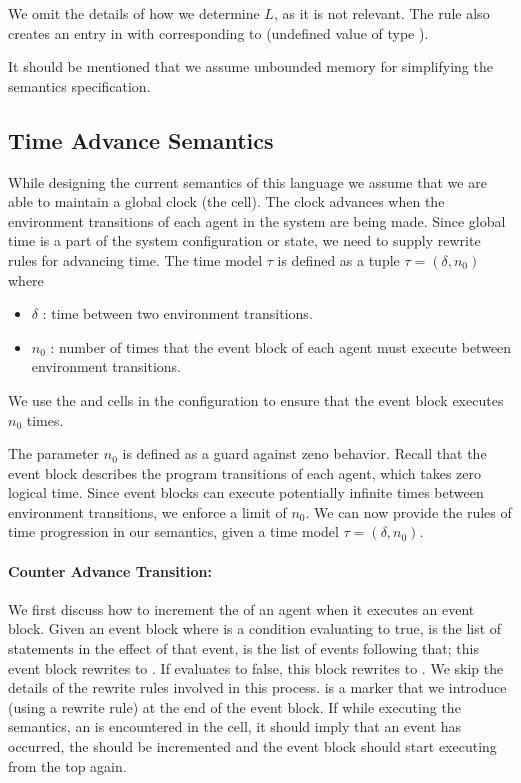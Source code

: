 We omit the details of how we determine $L$, as it is not relevant. The rule also creates an entry in  with  corresponding to  (undefined value of type ).  

It should be mentioned that we assume unbounded memory for simplifying the semantics specification.  

\subsection[h]{Time Advance Semantics}
\label{sect:exec}


While designing the current semantics of this language we assume that we are able to maintain a global clock (the  cell). The clock advances when the environment transitions of each agent in the system are being made. Since global time is a part of the system configuration or state, we need to supply rewrite rules for advancing time. The time model $\tau$ is defined as a tuple $\tau = (\delta, n_0)$ where 
 \begin{itemize}
 \item $\delta$ : time between two environment transitions. 
 \item $n_0$ : number of times that the event block of each agent must execute between environment transitions.
 
 \end{itemize}
 
  We use the  and  cells in the configuration to ensure that the event block executes ${n_0}$ times. 
 
 The parameter $n_0$ is defined as a guard against zeno behavior. Recall that the event block describes the program transitions of each agent, which takes zero logical time. Since event blocks can execute potentially infinite times between environment transitions, we enforce a limit of $n_0$.   
We can now provide the rules of time progression in our semantics, given a time model $\tau = (\delta,n_0)$. 

\paragraph{Counter Advance Transition:}
We first discuss how to increment the  of an agent when it executes an event block. Given an event block  where  is a condition evaluating to true,  is the list of statements in the effect of that event,  is the list of events following that; this event block rewrites to . If  evaluates to false, this block rewrites to . We skip the details of the rewrite rules involved in this process. 
 is a marker that we introduce (using a rewrite rule) at the end of the event block. If while executing the semantics, an  is encountered in the  cell, it should imply that an event has occurred, the  should be incremented and  the event block should start executing from the top again.
 
